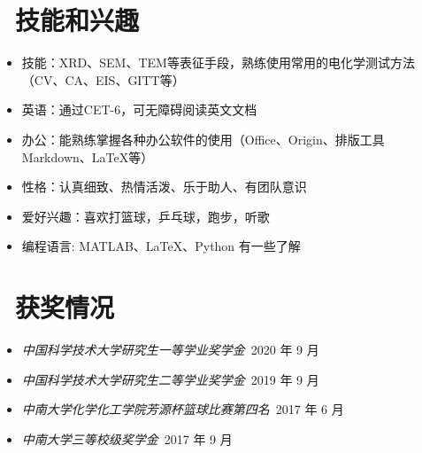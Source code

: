 \documentclass[11pt]{article}
\begin{document}
\section{\makebox[\widthof{\faGraduationCap}][c]{\color{CVBlue}\faCogs}\ 技能和兴趣}
\begin{itemize}[parsep=0.5ex]
  \item 技能：XRD、SEM、TEM等表征手段，熟练使用常用的电化学测试方法（CV、CA、EIS、GITT等）
  \item 英语：通过CET-6，可无障碍阅读英文文档
  \item 办公：能熟练掌握各种办公软件的使用（Office、Origin、排版工具Markdown、\LaTeX 等）
  \item 性格：认真细致、热情活泼、乐于助人、有团队意识
  \item 爱好兴趣：喜欢打篮球，乒乓球，跑步，听歌
  \item 编程语言: MATLAB、\LaTeX、Python 有一些了解
\end{itemize}




\section{\makebox[\widthof{\faGraduationCap}][c]{\color{CVBlue}\faInfo}\ 获奖情况}
\begin{itemize}[parsep=0.5ex]
  \item \textit{中国科学技术大学研究生一等学业奖学金}\  \hfill{2020 年 9 月}
  \item \textit{中国科学技术大学研究生二等学业奖学金}\  \hfill{2019 年 9 月}
  \item \textit{中南大学化学化工学院芳源杯篮球比赛第四名}\  \hfill{2017 年 6 月}
  \item \textit{中南大学三等校级奖学金}\  \hfill{2017 年 9 月}
\end{itemize}



\end{document}
